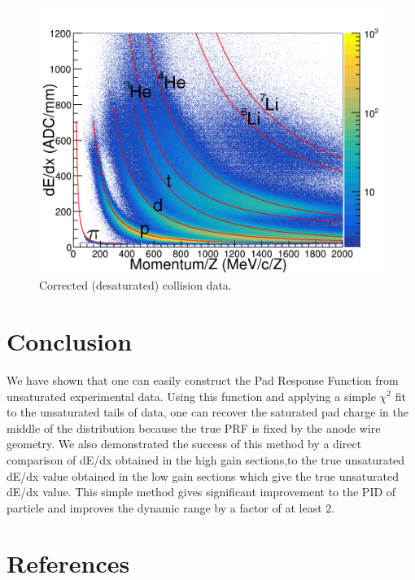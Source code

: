 \documentclass[review]{elsarticle}
\begin{document}
\begin{figure}[ht]
\includegraphics[width=\linewidth]{data_desat}
\caption{Corrected (desaturated) collision data.}
\label{fig:data_desat}
\end{figure}


\section{Conclusion}
We have shown that one can easily construct the Pad Response Function from unsaturated experimental data. Using this function and applying a simple $\chi^2$ fit to the unsaturated tails of data, one can recover the saturated pad charge in the middle of the distribution because the true PRF is fixed by the anode wire geometry. We also demonstrated the success of this method by a direct comparison of dE/dx obtained in the high gain sections,to the true unsaturated dE/dx value obtained in the low gain sections which give the true unsaturated dE/dx value. This simple method gives significant improvement to the PID of particle and improves the dynamic range by a factor of at least 2. 
\section*{References}


\end{document}
